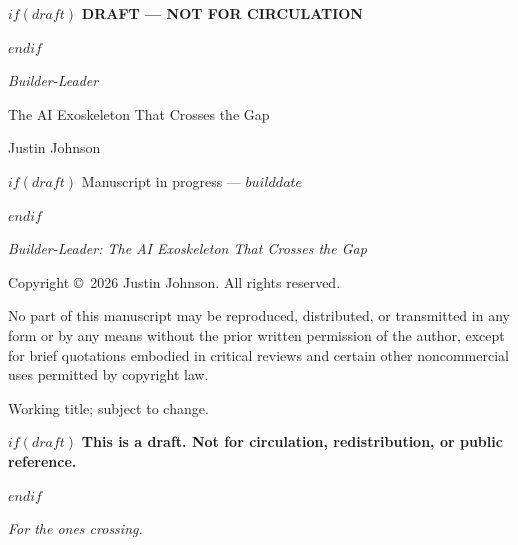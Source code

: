 
\begin{titlepage}
\thispagestyle{empty}
\begin{center}
\vspace*{2.2in}

$if(draft)$
{\sffamily\bfseries\fontsize{16pt}{18pt}\selectfont\color{red!70!black} DRAFT --- NOT FOR CIRCULATION}\par
\vspace{0.5in}
$endif$

{\sffamily\fontsize{34pt}{38pt}\selectfont\itshape Builder-Leader}\par
\vspace{0.25in}
{\sffamily\fontsize{16pt}{20pt}\selectfont The AI Exoskeleton That Crosses the Gap}\par

\vfill

{\sffamily\fontsize{14pt}{16pt}\selectfont Justin Johnson}\par
\vspace{0.5in}

$if(draft)$
{\small\sffamily\color{black!60} Manuscript in progress --- $builddate$}\par
$endif$

\end{center}
\end{titlepage}

\thispagestyle{empty}
\null\vfill
\noindent
\begin{small}
\textit{Builder-Leader: The AI Exoskeleton That Crosses the Gap}\par
\vspace{0.5em}
Copyright \copyright\ 2026 Justin Johnson. All rights reserved.\par
\vspace{0.5em}
No part of this manuscript may be reproduced, distributed, or transmitted in any form or by any means without the prior written permission of the author, except for brief quotations embodied in critical reviews and certain other noncommercial uses permitted by copyright law.\par
\vspace{0.5em}
Working title; subject to change.\par
$if(draft)$
\vspace{1em}
\textbf{This is a draft. Not for circulation, redistribution, or public reference.}\par
$endif$
\end{small}
\vspace{1in}
\clearpage

\thispagestyle{empty}
\null\vspace*{2in}
\begin{center}
\textit{For the ones crossing.}
\end{center}
\clearpage
